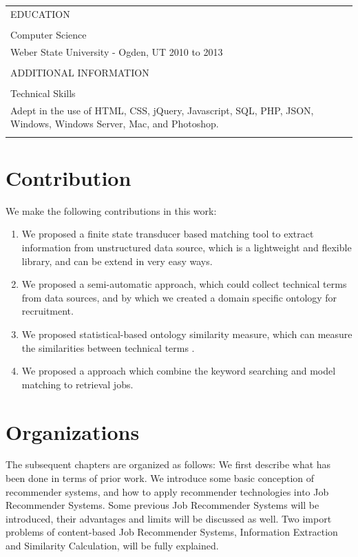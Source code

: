 \begin{table}[!p]
\begin{tabular}{    |  p{15cm} |  }
\\
EDUCATION\\
\\
Computer Science \\
Weber State University - Ogden, UT 2010 to 2013 \\
\\
ADDITIONAL INFORMATION \\
\\
Technical Skills \\
Adept in the use of HTML, CSS, jQuery, Javascript, SQL, PHP, JSON, Windows, Windows Server, Mac, and Photoshop. \\

\\
\hline

\end{tabular}
\label{tab:resume} %
\end{table}


\section{Contribution}

We make the following contributions in this work:

\begin{enumerate}
    \item  We proposed a finite state transducer based matching tool to extract information from unstructured data source, which is a lightweight and flexible library, and can be extend in very easy ways.
    \item  We proposed a semi-automatic approach, which could collect technical terms from data sources, and by which we created a domain specific ontology for recruitment.
    \item  We proposed statistical-based ontology similarity measure, which can measure the similarities between technical terms .
    \item  We proposed a approach which combine the keyword searching and model matching to retrieval jobs.
\end{enumerate}

\section{Organizations}
The subsequent chapters are organized as follows: We first describe what has been done in terms of prior work.  We introduce some basic conception of recommender systems, and how to apply recommender technologies into Job Recommender Systems. Some previous Job Recommender Systems will be introduced,  their advantages and limits will be discussed as well.  Two import problems of content-based Job Recommender Systems, Information Extraction and Similarity Calculation, will be fully explained.

